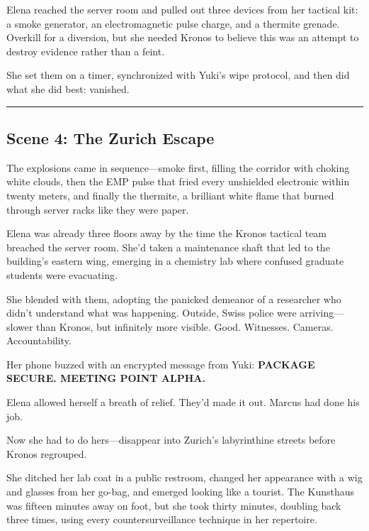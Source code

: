 Elena reached the server room and pulled out three devices from her tactical kit: a smoke generator, an electromagnetic pulse charge, and a thermite grenade. Overkill for a diversion, but she needed Kronos to believe this was an attempt to destroy evidence rather than a feint.

She set them on a timer, synchronized with Yuki's wipe protocol, and then did what she did best: vanished.

\begin{center}\rule{0.5\linewidth}{0.5pt}\end{center}

\hypertarget{scene-4-the-zurich-escape}{%
\subsection{Scene 4: The Zurich Escape}\label{scene-4-the-zurich-escape}}

The explosions came in sequence---smoke first, filling the corridor with choking white clouds, then the EMP pulse that fried every unshielded electronic within twenty meters, and finally the thermite, a brilliant white flame that burned through server racks like they were paper.

Elena was already three floors away by the time the Kronos tactical team breached the server room. She'd taken a maintenance shaft that led to the building's eastern wing, emerging in a chemistry lab where confused graduate students were evacuating.

She blended with them, adopting the panicked demeanor of a researcher who didn't understand what was happening. Outside, Swiss police were arriving---slower than Kronos, but infinitely more visible. Good. Witnesses. Cameras. Accountability.

Her phone buzzed with an encrypted message from Yuki: \textbf{PACKAGE SECURE. MEETING POINT ALPHA.}

Elena allowed herself a breath of relief. They'd made it out. Marcus had done his job.

Now she had to do hers---disappear into Zurich's labyrinthine streets before Kronos regrouped.

She ditched her lab coat in a public restroom, changed her appearance with a wig and glasses from her go-bag, and emerged looking like a tourist. The Kunsthaus was fifteen minutes away on foot, but she took thirty minutes, doubling back three times, using every countersurveillance technique in her repertoire.


